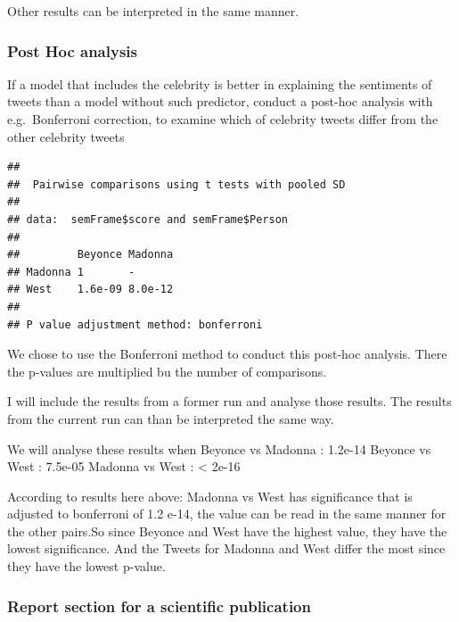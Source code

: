 \documentclass[]{article}
\newenvironment{Shaded}{\begin{snugshade}}{\end{snugshade}}
\newcommand{\KeywordTok}[1]{\textcolor[rgb]{0.13,0.29,0.53}{\textbf{#1}}}
\newcommand{\DataTypeTok}[1]{\textcolor[rgb]{0.13,0.29,0.53}{#1}}
\newcommand{\StringTok}[1]{\textcolor[rgb]{0.31,0.60,0.02}{#1}}
\newcommand{\CommentTok}[1]{\textcolor[rgb]{0.56,0.35,0.01}{\textit{#1}}}
\newcommand{\OtherTok}[1]{\textcolor[rgb]{0.56,0.35,0.01}{#1}}
\newcommand{\OperatorTok}[1]{\textcolor[rgb]{0.81,0.36,0.00}{\textbf{#1}}}
\newcommand{\NormalTok}[1]{#1}
\begin{document}
Other results can be interpreted in the same manner.

\subsubsection{Post Hoc analysis}\label{post-hoc-analysis}

If a model that includes the celebrity is better in explaining the
sentiments of tweets than a model without such predictor, conduct a
post-hoc analysis with e.g.~Bonferroni correction, to examine which of
celebrity tweets differ from the other celebrity tweets

\begin{Shaded}
\end{Shaded}

\begin{verbatim}
## 
##  Pairwise comparisons using t tests with pooled SD 
## 
## data:  semFrame$score and semFrame$Person 
## 
##         Beyonce Madonna
## Madonna 1       -      
## West    1.6e-09 8.0e-12
## 
## P value adjustment method: bonferroni
\end{verbatim}

We chose to use the Bonferroni method to conduct this post-hoc analysis.
There the p-values are multiplied bu the number of comparisons.

I will include the results from a former run and analyse those results.
The results from the current run can than be interpreted the same way.

We will analyse these results when Beyonce vs Madonna : 1.2e-14 Beyonce
vs West : 7.5e-05 Madonna vs West : \textless{} 2e-16

According to results here above: Madonna vs West has significance that
is adjusted to bonferroni of 1.2 e-14, the value can be read in the same
manner for the other pairs.So since Beyonce and West have the highest
value, they have the lowest significance. And the Tweets for Madonna and
West differ the most since they have the lowest p-value.

\subsubsection{Report section for a scientific
publication}\label{report-section-for-a-scientific-publication}
\end{document}
